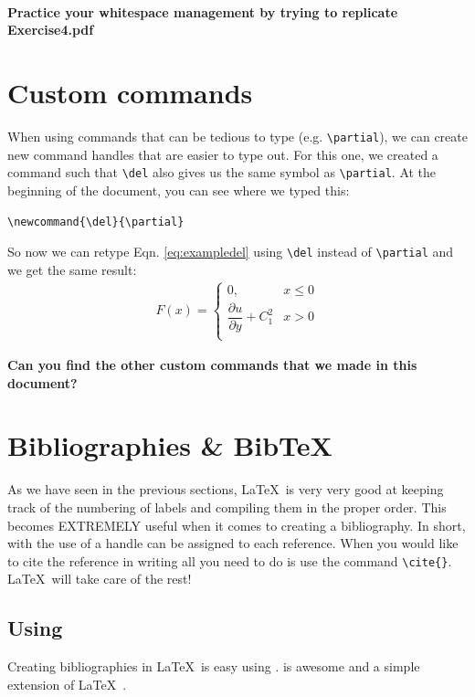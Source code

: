 \documentclass[]{article}%
\newcommand{\del}{\partial}
\newcommand{\bs}{\textbackslash}
\newcommand{\TT}[1]{\texttt{#1}}
\newcommand{\tpc}{\textperiodcentered}
\theoremstyle{definition}
\begin{document}
\paragraph{Practice your whitespace management by trying to replicate Exercise4.pdf}
\clearpage

\section{Custom commands}
\label{sec:customcommands}
When using commands that can be tedious to type (e.g. \TT{\bs partial}), we can create new command handles that are easier to type out.
For this one, we created a command such that \TT{\bs del} also gives us the same symbol as \TT{\bs partial}.
At the beginning of the document, you can see where we typed this:
\begin{center}
\TT{\bs newcommand\{\bs del\}\{\bs partial\}} \\
\end{center}
So now we can retype Eqn. \eqref{eq:exampledel} using \TT{\bs del} instead of \TT{\bs partial} and we get the same result:
\begin{align*}
	F(x) = \left\{ 
		\begin{array}{ll}
			0, & x \leq 0 \\
			\dfrac{\del u}{\del y} + C_1^2  & x > 0\\
		\end{array}
	\right. 
\end{align*}
\vspace{1cm}

\begin{center}
	\textbf{Can you find the other custom commands that we made in this document?}
\end{center}

\clearpage
\section{Bibliographies \& BibTeX}
\label{sec:bibliography}
As we have seen in the previous sections, \LaTeX\ is very very good at keeping track of the numbering of labels and compiling them in the proper order.
This becomes EXTREMELY useful when it comes to creating a bibliography.
In short, with the use of  a handle can be assigned to each reference.
When you would like to cite the reference in writing all you need to do is use the command \TT{\bs cite\{\tpc\}}.
\LaTeX\ will take care of the rest!

\subsection{Using }
Creating bibliographies in \LaTeX\ is easy using .
 is awesome and a simple extension of \LaTeX\ \cite{MyRef0}.
\end{document}
